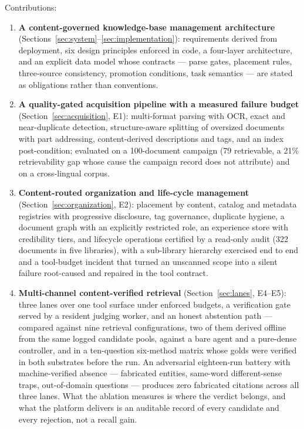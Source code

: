 \noindent Contributions:
\begin{enumerate}
\item \textbf{A content-governed knowledge-base management architecture}
(Sections~\ref{sec:system}--\ref{sec:implementation}): requirements derived
from deployment, six design principles enforced in code, a four-layer
architecture, and an explicit data model whose contracts --- parse gates,
placement rules, three-source consistency, promotion conditions, task
semantics --- are stated as obligations rather than conventions.
\item \textbf{A quality-gated acquisition pipeline with a measured failure
budget} (Section~\ref{sec:acquisition}, E1): multi-format parsing with OCR,
exact and near-duplicate detection, structure-aware splitting of oversized
documents with part addressing, content-derived descriptions and tags, and an
index post-condition; evaluated on a 100-document campaign (79 retrievable,
a 21\% retrievability gap whose cause the campaign record does not
attribute) and on a cross-lingual corpus.
\item \textbf{Content-routed organization and life-cycle management}
(Section~\ref{sec:organization}, E2): placement by content, catalog and
metadata registries with progressive disclosure, tag governance, duplicate
hygiene, a document graph with an explicitly restricted role, an experience
store with credibility tiers, and lifecycle operations certified by a
read-only audit (322 documents in five libraries), with a sub-library
hierarchy exercised end to end and a tool-budget incident that turned an
unscanned scope into a silent failure root-caused and repaired in the tool
contract.
\item \textbf{Multi-channel content-verified retrieval} (Section~\ref{sec:lanes},
E4--E5): three lanes over one tool surface under enforced budgets, a
verification gate served by a resident judging worker, and an honest
abstention path --- compared against nine retrieval configurations, two of
them derived offline from the same logged candidate pools, against a
bare agent and a pure-dense controller, and in a ten-question six-method
matrix whose golds were verified in both substrates before the run. An
adversarial eighteen-run battery with machine-verified absence --- fabricated
entities, same-word different-sense traps, out-of-domain questions ---
produces zero fabricated citations across all three lanes. What the ablation
measures is where
the verdict belongs, and what the platform delivers is an auditable record of
every candidate and every rejection, not a recall gain.

\end{enumerate}
